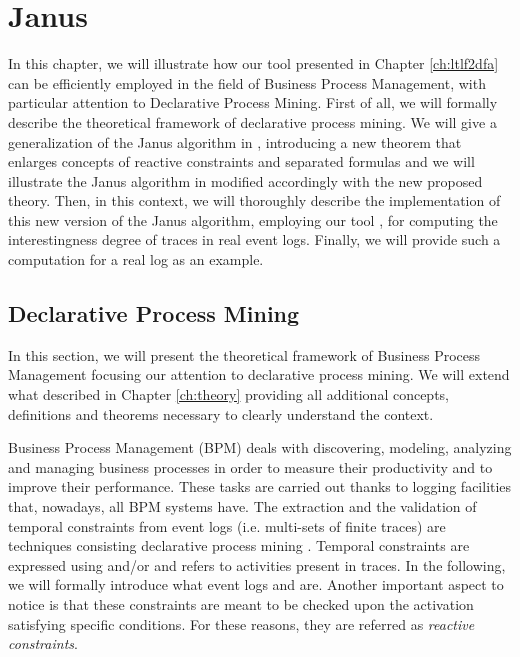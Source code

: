 \chapter{Janus}\label{ch:janus}
In this chapter, we will illustrate how our tool \LTLfToDFA presented in Chapter \ref{ch:ltlf2dfa} can be efficiently employed in the field of Business Process Management, with particular attention to Declarative Process Mining. First of all, we will formally describe the theoretical framework of declarative process mining. We will give a generalization of the Janus algorithm in \citep{cecconi2018interestingness}, introducing a new theorem that enlarges concepts of reactive constraints and separated formulas and we will illustrate the Janus algorithm in \citep{cecconi2018interestingness} modified accordingly with the new proposed theory. Then, in this context, we will thoroughly describe the implementation of this new version of the Janus algorithm, employing our tool \LTLfToDFA, for computing the interestingness degree of traces in real event logs. Finally, we will provide such a computation for a real log as an example. 
\section{Declarative Process Mining}
In this section, we will present the theoretical framework of Business Process Management focusing our attention to declarative process mining. We will extend what described in Chapter \ref{ch:theory} providing all additional concepts, definitions and theorems necessary to clearly understand the context.

Business Process Management (BPM) deals with discovering, modeling, analyzing and managing business processes in order to measure their productivity and to improve their performance. These tasks are carried out thanks to logging facilities that, nowadays, all BPM systems have. The extraction and the validation of temporal constraints from event logs (i.e. multi-sets of finite traces) are techniques consisting declarative process mining \citep{montali2010declarative}. Temporal constraints are expressed using \LTLf and/or \PLTL and refers to activities present in traces. In the following, we will formally introduce what event logs and \declare \citep{pesic2008constraint} are. Another important aspect to notice is that these constraints are meant to be checked upon the activation satisfying specific conditions. For these reasons, they are referred as \emph{reactive constraints}.
